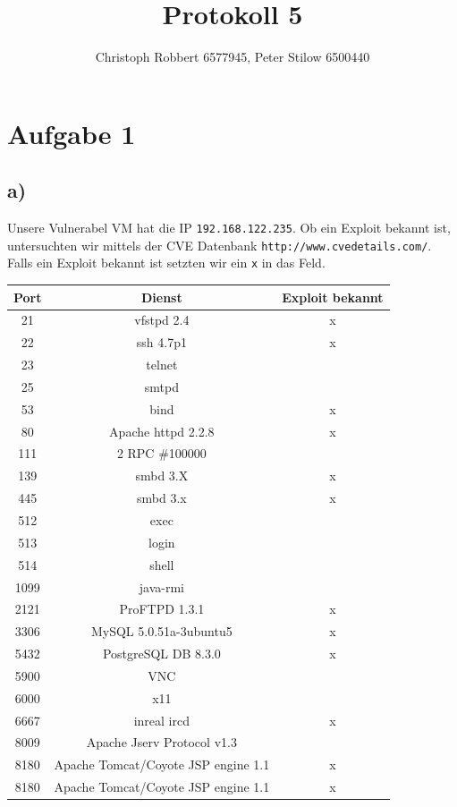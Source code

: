 \documentclass[10pt,a4paper]{article}
\author{Christoph Robbert 6577945, Peter Stilow 6500440}
\title{Protokoll 5}
\begin{document}
\maketitle
 
\section*{Aufgabe 1}

\subsection*{a)}
Unsere Vulnerabel VM hat die IP \texttt{192.168.122.235}. Ob ein Exploit bekannt ist, untersuchten wir mittels der CVE Datenbank \texttt{http://www.cvedetails.com/}. Falls ein Exploit bekannt ist setzten wir ein \texttt{x} in das Feld.
\begin{tabular}{|c|c|c|}
\hline 
Port & Dienst & Exploit bekannt \\ 
\hline 
21 & vfstpd 2.4 & x \\ 
\hline 
22 & ssh 4.7p1 & x \\ 
\hline 
23 & telnet &  \\ 
\hline 
25 & smtpd &  \\ 
\hline 
53 & bind & x \\ 
\hline 
80 & Apache httpd 2.2.8 & x \\ 
\hline 
111 & 2 RPC \#100000 &  \\ 
\hline 
139 & smbd 3.X & x \\ 
\hline 
445 & smbd 3.x & x \\ 
\hline 
512 & exec & \\
\hline
513 & login & \\
\hline
514 & shell & \\
\hline
1099 & java-rmi & \\
\hline
2121 & ProFTPD 1.3.1 & x \\
\hline
3306 & MySQL 5.0.51a-3ubuntu5 & x\\
\hline
5432 & PostgreSQL DB 8.3.0 &  x \\
\hline
5900 & VNC & \\
\hline
6000 & x11 & \\
\hline
6667 & inreal ircd & x\\
\hline
8009 & Apache Jserv Protocol v1.3 & \\
\hline
8180 & Apache Tomcat/Coyote JSP engine 1.1 & x\\
\hline
8180 & Apache Tomcat/Coyote JSP engine 1.1 & x\\
\hline

\end{tabular} 
\end{document}
